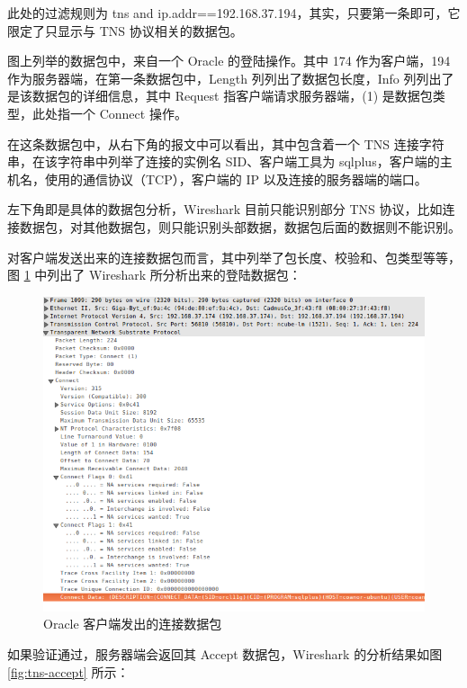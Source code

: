 此处的过滤规则为 {\cf tns and ip.addr==192.168.37.194}，其实，只要第一条即可，它限定了只显示与 TNS 协议相关的数据包。

图上列举的数据包中，来自一个 Oracle 的登陆操作。其中 174 作为客户端，194 作为服务器端，在第一条数据包中，{\ef Length} 列列出了数据包长度，{\ef Info} 列列出了是该数据包的详细信息，其中 {\cf Request} 指客户端请求服务器端，{\cf (1)} 是数据包类型，此处指一个 {\cf Connect} 操作。

在这条数据包中，从右下角的报文中可以看出，其中包含着一个 TNS 连接字符串，在该字符串中列举了连接的实例名 {\cf SID}、客户端工具为 {\cf sqlplus}，客户端的主机名，使用的通信协议（TCP），客户端的 IP 以及连接的服务器端的端口。

左下角即是具体的数据包分析，Wireshark 目前只能识别部分 TNS 协议，比如连接数据包，对其他数据包，则只能识别头部数据，数据包后面的数据则不能识别。

对客户端发送出来的连接数据包而言，其中列举了包长度、校验和、包类型等等，图 \ref{fig:tns-connect} 中列出了 Wireshark 所分析出来的登陆数据包：

\begin{figure}[h!]
    \caption{Oracle 客户端发出的连接数据包}
    \label{fig:tns-connect}
    \centering
    \includegraphics[width=\textwidth]{tns-connect.png}
\end{figure}

如果验证通过，服务器端会返回其 {\cf Accept} 数据包，Wireshark 的分析结果如图 \ref{fig:tns-accept} 所示：

